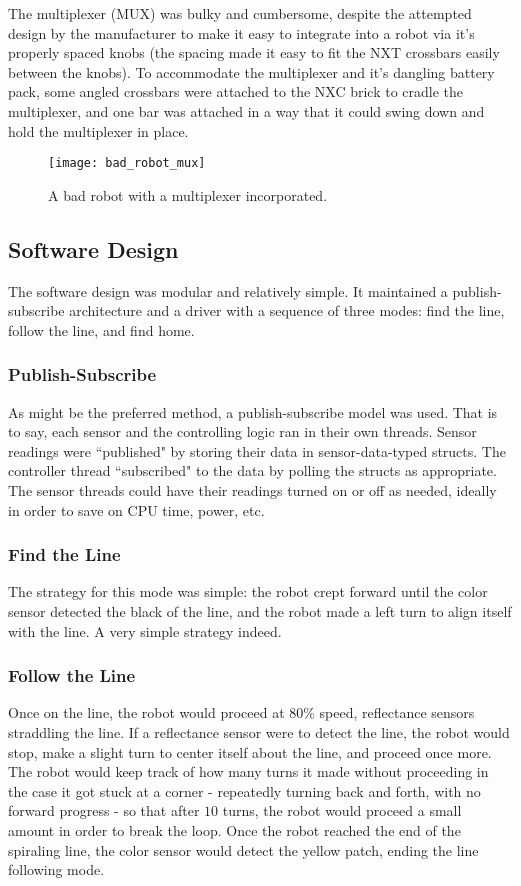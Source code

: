 \documentclass{article}
\begin{document}
The multiplexer (MUX) was bulky and cumbersome, despite the attempted design by the manufacturer to make it easy to integrate into a robot via it's properly spaced knobs (the spacing made it easy to fit the NXT crossbars easily between the knobs). To accommodate the multiplexer and it's dangling battery pack, some angled crossbars were attached to the NXC brick to cradle the multiplexer, and one bar was attached in a way that it could swing down and hold the multiplexer in place.

    \begin{figure}[h]
    \centering
    \texttt{[image: bad\_robot\_mux]}
    \caption{A bad robot with a multiplexer incorporated.}
    \label{fig:bad_robot_mux}
    \end{figure}

\newpage
\subsection{Software Design}
The software design was modular and relatively simple. It maintained a publish-subscribe architecture and a driver with a sequence of three modes: find the line, follow the line, and find home.

\subsubsection{Publish-Subscribe}
As might be the preferred method, a publish-subscribe model was used. That is to say, each sensor and the controlling logic ran in their own threads. Sensor readings were ``published" by storing their data in sensor-data-typed structs. The controller thread ``subscribed" to the data by polling the structs as appropriate. The sensor threads could have their readings turned on or off as needed, ideally in order to save on CPU time, power, etc.

\subsubsection{Find the Line}
The strategy for this mode was simple: the robot crept forward until the color sensor detected the black of the line, and the robot made a left turn to align itself with the line. A very simple strategy indeed.

\subsubsection{Follow the Line}
Once on the line, the robot would proceed at $80\%$ speed, reflectance sensors straddling the line. If a reflectance sensor were to detect the line, the robot would stop, make a slight turn to center itself about the line, and proceed once more. The robot would keep track of how many turns it made without proceeding in the case it got stuck at a corner - repeatedly turning back and forth, with no forward progress - so that after $10$ turns, the robot would proceed a small amount in order to break the loop. Once the robot reached the end of the spiraling line, the color sensor would detect the yellow patch, ending the line following mode.
\end{document}
